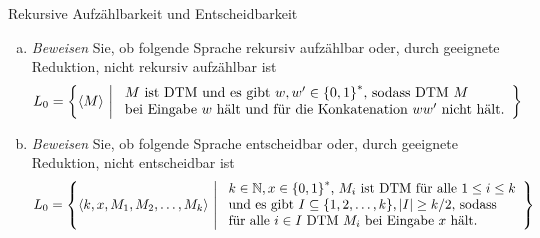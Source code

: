 \documentclass[answers]{submit}
\begin{document}
\begin{exercise}[6]{Rekursive Aufzählbarkeit und Entscheidbarkeit}

  \begin{enumerate}[a)]
    \item \emph{Beweisen} Sie, ob folgende Sprache rekursiv aufzählbar oder, durch geeignete Reduktion, nicht rekursiv aufzählbar ist
          \[
            L_{\theenumi} = \set{\dtm[M]}{\begin{array}{l} \text{$M$ ist DTM und es gibt $w,w'\in\Bin^*$, sodass DTM $M$} \\
                \text{bei Eingabe $w$ hält und für die Konkatenation $ww'$ nicht hält.}
              \end{array}}
          \]
    \item \emph{Beweisen} Sie, ob folgende Sprache entscheidbar oder, durch geeignete Reduktion, nicht entscheidbar ist
          \[
            L_{\theenumi} = \set{\dtm[k,x,M_1,M_2,\dots,M_k]}{
              \begin{array}{l}
                \text{$k\in\N,x\in \Bin^*$, $M_i$ ist DTM für alle $1\le i \le k$}    \\
                \text{und es gibt $I\subseteq\{1,2,\dots,k\},\abs{I}\ge k/2$, sodass} \\
                \text{für alle $i\in I$ DTM $M_i$  bei Eingabe $x$ hält. }
              \end{array}}
          \]
  \end{enumerate}

\end{exercise}
\end{document}
